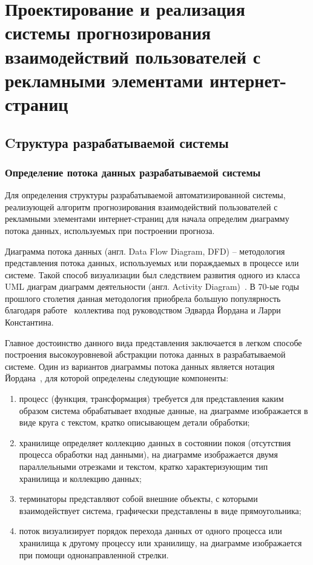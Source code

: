 \section{Проектирование и реализация системы прогнозирования взаимодействий пользователей с рекламными элементами \mbox{интернет-страниц}}
\subsection{Cтруктура разрабатываемой системы}
\subsubsection{Определение потока данных разрабатываемой системы}
Для определения структуры разрабатываемой автоматизированной системы, реализующей алгоритм прогнозирования взаимодействий
пользователей с рекламными элементами интернет-страниц для начала определим диаграмму потока данных, используемых при
построении прогноза.

Диаграмма потока данных (англ. Data Flow Diagram, DFD) -- методология представления потока данных, используемых или
пораждаемых в процессе или системе. Такой способ визуализации был следствием развития одного из класса UML диаграм
диаграмм деятельности (англ. Activity Diagram)~\autocite{impl:ad}. В 70-ые годы прошлого столетия данная методология
приобрела большую популярность благодаря работе~\autocite{impl:dfd} коллектива под руководством Эдварда Йордана и
Ларри Константина.

Главное достоинство данного вида представления заключается в легком способе построения высокоуровневой абстракции
потока данных в разрабатываемой системе. Один из вариантов диаграммы потока данных является нотация 
Йордана~\autocite{impl:yourdan}, для которой определены следующие компоненты:
\begin{enumerate}
    \item процесс (функция, трансформация) требуется для представления каким образом система обрабатывает 
    входные данные, на диаграмме изображается в виде круга с текстом, кратко описывающем детали обработки;
    \item хранилище определяет коллекцию данных в состоянии покоя (отсутствия процесса обработки над данными),
    на диаграмме изображается двумя параллельными отрезками и текстом, кратко характеризующим тип хранилища и
    коллекцию данных; 
    \item терминаторы представляют собой внешние объекты, с которыми взаимодействует система, графически представлены
    в виде прямоугольника;
    \item поток визуализирует порядок перехода данных от одного процесса или хранилища к другому процессу или
    хранилищу, на диаграмме изображается при помощи однонаправленной стрелки.
\end{enumerate}


